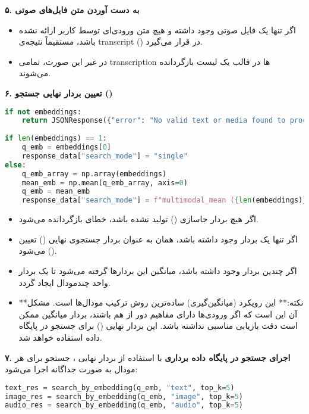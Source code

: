 \documentclass{article}
\begin{document}
\textbf{۵. به دست آوردن متن فایل‌های صوتی}
\begin{itemize}
    \item اگر تنها یک فایل صوتی وجود داشته و هیچ متن ورودی‌ای توسط کاربر ارائه نشده باشد، مستقیماً نتیجه‌ی transcript  () در  قرار می‌گیرد.
    \item در غیر این صورت، تمامی transcription ها در قالب یک لیست بازگردانده می‌شوند.
\end{itemize}

\textbf{۶. تعیین بردار نهایی جستجو ()}

\begin{latin}
\begin{lstlisting}[language=Python]
if not embeddings:
    return JSONResponse({"error": "No valid text or media found to process."}, status_code=400)
 
if len(embeddings) == 1:
    q_emb = embeddings[0]
    response_data["search_mode"] = "single"
else:
    q_emb_array = np.array(embeddings)
    mean_emb = np.mean(q_emb_array, axis=0)
    q_emb = mean_emb
    response_data["search_mode"] = f"multimodal_mean ({len(embeddings)} inputs)"
\end{lstlisting}
\end{latin}

\begin{itemize}
    \item اگر هیچ بردار جاسازی () تولید نشده باشد، خطای  بازگردانده می‌شود.
    \item اگر تنها یک بردار وجود داشته باشد، همان به عنوان بردار جستجوی نهایی () تعیین می‌شود ().
    \item اگر چندین بردار وجود داشته باشد، میانگین این بردارها گرفته می‌شود تا یک بردار واحد چندمودال ایجاد گردد.
    \item **نکته:** این رویکرد (میانگین‌گیری) ساده‌ترین روش ترکیب مودال‌ها است. مشکل آن این است که اگر ورودی‌ها دارای مفاهیم دور از هم باشند، بردار میانگین ممکن است دقت بازیابی مناسبی نداشته باشد. این بردار نهایی () برای جستجو در پایگاه داده استفاده خواهد شد.
\end{itemize}


\textbf{۷. اجرای جستجو در پایگاه داده برداری}
با استفاده از بردار نهایی ، جستجو برای هر مودال به صورت جداگانه اجرا می‌شود:

\begin{latin}
\begin{lstlisting}[language=Python]
text_res = search_by_embedding(q_emb, "text", top_k=5)
image_res = search_by_embedding(q_emb, "image", top_k=5)
audio_res = search_by_embedding(q_emb, "audio", top_k=5)
\end{lstlisting}
\end{latin}
\end{document}
